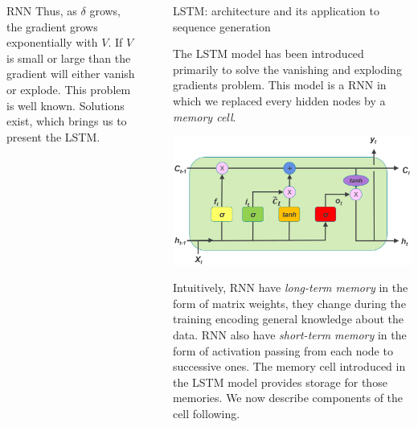 \documentclass[final]{beamer}
\newlength{\sepwidth}
\newlength{\colwidth}
\newcommand{\separatorcolumn}{\begin{column}{\sepwidth}\end{column}}
\begin{document}
\begin{frame}[t]
\begin{columns}[t]
\begin{column}{\colwidth}
\begin{block}{RNN}
Thus, as $\delta$ grows, the gradient grows exponentially with $V$. If $V$ is
small or large than the gradient will either vanish or explode. This problem is
well known. Solutions exist, which brings us to present the LSTM.
\end{block}
\end{column}
\separatorcolumn

\begin{column}{\colwidth}

\begin{block}{LSTM: architecture and its application to sequence generation}

The LSTM model has been introduced primarily to solve the vanishing and
exploding gradients problem. This model is a RNN in which we replaced every
hidden nodes by a \textit{memory cell}.  \begin{center}
    \includegraphics[width = 0.7\linewidth]{lstm.png}
\end{center}

Intuitively, RNN have \textit{long-term memory} in the form of matrix weights,
they change during the training encoding general knowledge about the data. RNN
also have \textit{short-term memory} in the form of activation passing from
each node to successive ones. The memory cell introduced in the LSTM model
provides storage for those memories. We now describe components of the cell
following.\cite{review}


\end{block}
\end{column}
\end{columns}
\end{frame}
\end{document}
